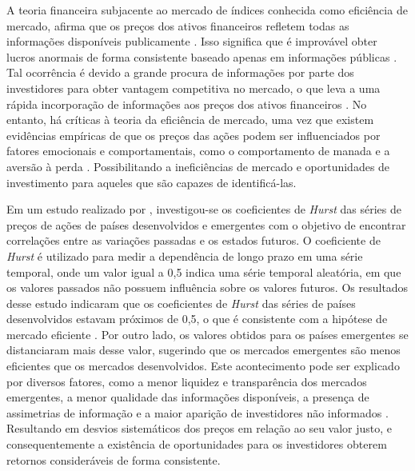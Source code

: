 A teoria financeira subjacente ao mercado de índices conhecida como eficiência de mercado, afirma que os preços dos ativos financeiros refletem todas as informações disponíveis publicamente \cite{Paul_Proof}. Isso significa que é improvável obter lucros anormais de forma consistente baseado apenas em informações públicas \cite{MALKIEL2003}. Tal ocorrência é devido a grande procura de informações por parte dos investidores para obter vantagem competitiva no mercado, o que leva a uma rápida incorporação de informações aos preços dos ativos financeiros \cite{Fama_EFFICIENT}. 
No entanto, há críticas à teoria da eficiência de mercado, uma vez que existem evidências empíricas de que os preços das ações podem ser influenciados por fatores emocionais e comportamentais, como o comportamento de manada e a aversão à perda \cite{Shiller2000}. Possibilitando a ineficiências de mercado e oportunidades de investimento para aqueles que são capazes de identificá-las.

Em um estudo realizado por , investigou-se os coeficientes de \textit{Hurst} das séries de preços de ações de países desenvolvidos e emergentes com o objetivo de encontrar correlações entre as variações passadas e os estados futuros. O coeficiente de \textit{Hurst} é utilizado para medir a dependência de longo prazo em uma série temporal, onde um valor igual a 0,5 indica uma série temporal aleatória, em que os valores passados não possuem influência sobre os valores futuros. 
Os resultados desse estudo indicaram que os coeficientes de \textit{Hurst} das séries de países desenvolvidos estavam próximos de 0,5, o que é consistente com a hipótese de mercado eficiente \cite{mussa2010hipotese}. Por outro lado, os valores obtidos para os países emergentes se distanciaram mais desse valor, sugerindo que os mercados emergentes são menos eficientes que os mercados desenvolvidos.
Este acontecimento pode ser explicado por diversos fatores, como a menor liquidez e transparência dos mercados emergentes, a menor qualidade das informações disponíveis, a presença de assimetrias de informação e a maior aparição de investidores não informados \cite{BARBERIS1998307}. Resultando em desvios sistemáticos dos preços em relação ao seu valor justo, e consequentemente a existência de oportunidades para os investidores obterem retornos consideráveis de forma consistente. 

